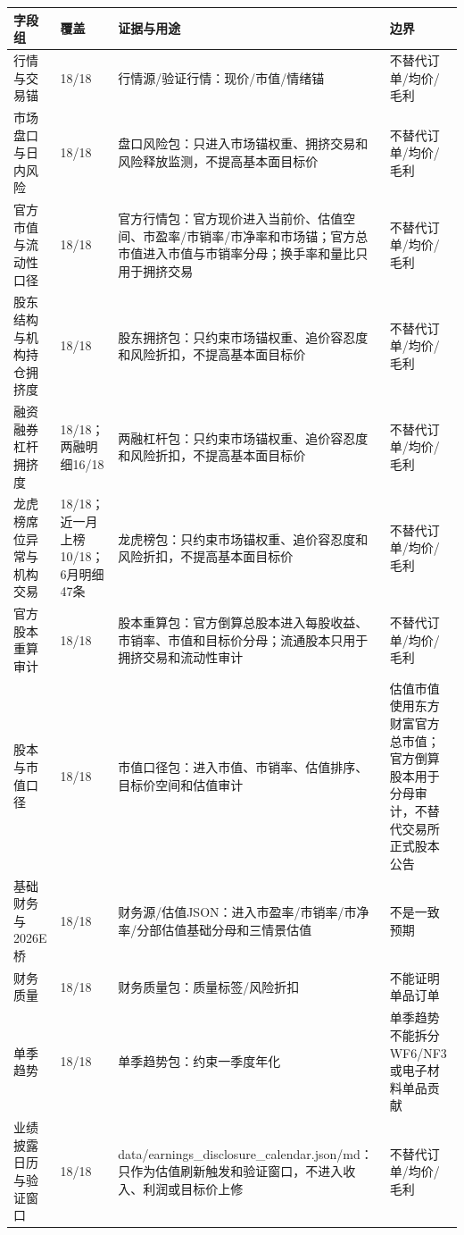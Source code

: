 \begin{exhibitbox}
\scriptsize
\begin{tabularx}{\exhibitboxwidth}{L{2.1cm} L{1.65cm} X X}
\toprule
\textbf{字段组} & \textbf{覆盖} & \textbf{证据与用途} & \textbf{边界} \\
\midrule
行情与交易锚 & 18/18 & 行情源/验证行情：现价/市值/情绪锚 & 不替代订单/均价/毛利 \\
市场盘口与日内风险 & 18/18 & 盘口风险包：只进入市场锚权重、拥挤交易和风险释放监测，不提高基本面目标价 & 不替代订单/均价/毛利 \\
官方市值与流动性口径 & 18/18 & 官方行情包：官方现价进入当前价、估值空间、市盈率/市销率/市净率和市场锚；官方总市值进入市值与市销率分母；换手率和量比只用于拥挤交易 & 不替代订单/均价/毛利 \\
股东结构与机构持仓拥挤度 & 18/18 & 股东拥挤包：只约束市场锚权重、追价容忍度和风险折扣，不提高基本面目标价 & 不替代订单/均价/毛利 \\
融资融券杠杆拥挤度 & 18/18；两融明细16/18 & 两融杠杆包：只约束市场锚权重、追价容忍度和风险折扣，不提高基本面目标价 & 不替代订单/均价/毛利 \\
龙虎榜席位异常与机构交易 & 18/18；近一月上榜10/18；6月明细47条 & 龙虎榜包：只约束市场锚权重、追价容忍度和风险折扣，不提高基本面目标价 & 不替代订单/均价/毛利 \\
官方股本重算审计 & 18/18 & 股本重算包：官方倒算总股本进入每股收益、市销率、市值和目标价分母；流通股本只用于拥挤交易和流动性审计 & 不替代订单/均价/毛利 \\
股本与市值口径 & 18/18 & 市值口径包：进入市值、市销率、估值排序、目标价空间和估值审计 & 估值市值使用东方财富官方总市值；官方倒算股本用于分母审计，不替代交易所正式股本公告 \\
基础财务与2026E桥 & 18/18 & 财务源/估值JSON：进入市盈率/市销率/市净率/分部估值基础分母和三情景估值 & 不是一致预期 \\
财务质量 & 18/18 & 财务质量包：质量标签/风险折扣 & 不能证明单品订单 \\
单季趋势 & 18/18 & 单季趋势包：约束一季度年化 & 单季趋势不能拆分WF6/NF3或电子材料单品贡献 \\
业绩披露日历与验证窗口 & 18/18 & data/earnings\_disclosure\_calendar.json/md：只作为估值刷新触发和验证窗口，不进入收入、利润或目标价上修 & 不替代订单/均价/毛利 \\
\bottomrule
\end{tabularx}
\end{exhibitbox}

